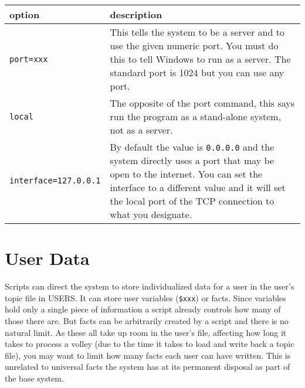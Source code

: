 \documentclass[]{article}
\begin{document}
\begin{longtable}[]{@{}ll@{}}
\toprule
\begin{minipage}[b]{0.22\columnwidth}\raggedright\strut
option\strut
\end{minipage} & \begin{minipage}[b]{0.72\columnwidth}\raggedright\strut
description\strut
\end{minipage}\tabularnewline
\midrule
\endhead
\begin{minipage}[t]{0.22\columnwidth}\raggedright\strut
\texttt{port=xxx}\strut
\end{minipage} & \begin{minipage}[t]{0.72\columnwidth}\raggedright\strut
This tells the system to be a server and to use the given numeric port.
You must do this to tell Windows to run as a server. The standard port
is 1024 but you can use any port.\strut
\end{minipage}\tabularnewline
\begin{minipage}[t]{0.22\columnwidth}\raggedright\strut
\texttt{local}\strut
\end{minipage} & \begin{minipage}[t]{0.72\columnwidth}\raggedright\strut
The opposite of the port command, this says run the program as a
stand-alone system, not as a server.\strut
\end{minipage}\tabularnewline
\begin{minipage}[t]{0.22\columnwidth}\raggedright\strut
\texttt{interface=127.0.0.1}\strut
\end{minipage} & \begin{minipage}[t]{0.72\columnwidth}\raggedright\strut
By default the value is \texttt{0.0.0.0} and the system directly uses a
port that may be open to the internet. You can set the interface to a
different value and it will set the local port of the TCP connection to
what you designate.\strut
\end{minipage}\tabularnewline
\bottomrule
\end{longtable}

\section{User Data}\label{user-data}

Scripts can direct the system to store individualized data for a user in
the user's topic file in USERS. It can store user variables
(\texttt{\$xxx}) or facts. Since variables hold only a single piece of
information a script already controls how many of those there are. But
facts can be arbitrarily created by a script and there is no natural
limit. As these all take up room in the user's file, affecting how long
it takes to process a volley (due to the time it takes to load and write
back a topic file), you may want to limit how many facts each user can
have written. This is unrelated to universal facts the system has at its
permanent disposal as part of the base system.
\end{document}

